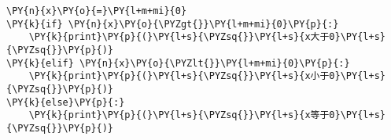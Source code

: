 \begin{Verbatim}[commandchars=\\\{\}]
\PY{n}{x}\PY{o}{=}\PY{l+m+mi}{0}
\PY{k}{if} \PY{n}{x}\PY{o}{\PYZgt{}}\PY{l+m+mi}{0}\PY{p}{:}
    \PY{k}{print}\PY{p}{(}\PY{l+s}{\PYZsq{}}\PY{l+s}{x大于0}\PY{l+s}{\PYZsq{}}\PY{p}{)}
\PY{k}{elif} \PY{n}{x}\PY{o}{\PYZlt{}}\PY{l+m+mi}{0}\PY{p}{:}
    \PY{k}{print}\PY{p}{(}\PY{l+s}{\PYZsq{}}\PY{l+s}{x小于0}\PY{l+s}{\PYZsq{}}\PY{p}{)}
\PY{k}{else}\PY{p}{:}
    \PY{k}{print}\PY{p}{(}\PY{l+s}{\PYZsq{}}\PY{l+s}{x等于0}\PY{l+s}{\PYZsq{}}\PY{p}{)}
\end{Verbatim}
